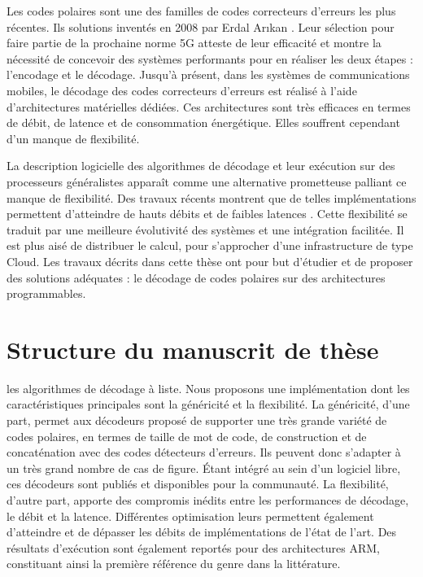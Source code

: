 Les codes polaires sont une des familles de codes correcteurs d'erreurs les plus récentes. Ils solutions inventés en 2008 par Erdal Ar{\i}kan \cite{arikan_channel_2009}. Leur sélection pour faire partie de la prochaine norme 5G atteste de leur efficacité et montre la nécessité de concevoir des systèmes performants pour en réaliser les deux étapes : l'encodage et le décodage. Jusqu'à présent, dans les systèmes de communications mobiles, le décodage des codes correcteurs d'erreurs est réalisé à l'aide d'architectures matérielles dédiées. Ces architectures sont très efficaces en termes de débit, de latence et de consommation énergétique. Elles souffrent cependant d'un manque de flexibilité.


La description logicielle des algorithmes de décodage et leur exécution sur des processeurs généralistes apparaît comme une alternative prometteuse palliant ce manque de flexibilité. Des travaux récents montrent que de telles implémentations permettent d'atteindre de hauts débits et de faibles latences \cite{sarkis_fast_2014,giard_fast_2014}. Cette flexibilité se traduit par une meilleure évolutivité des systèmes et une intégration facilitée. Il est plus aisé de distribuer le calcul, pour s'approcher d'une infrastructure de type Cloud. Les travaux décrits dans cette thèse ont pour but d'étudier et de proposer des solutions adéquates : le décodage de codes polaires sur des architectures programmables.

\section*{Structure du manuscrit de thèse}

les algorithmes de décodage à liste. Nous proposons une implémentation dont les caractéristiques principales sont la généricité et la flexibilité. La généricité, d'une part, permet aux décodeurs proposé de supporter une très grande variété de codes polaires, en termes de taille de mot de code, de construction et de concaténation avec des codes détecteurs d'erreurs. Ils peuvent donc s'adapter à un très grand nombre de cas de figure. \'Etant intégré au sein d'un logiciel libre, ces décodeurs sont publiés et disponibles pour la communauté. La flexibilité, d'autre part, apporte des compromis inédits entre les performances de décodage, le débit et la latence. Différentes optimisation leurs permettent également d'atteindre et de dépasser les débits de implémentations de l'état de l'art. Des résultats d'exécution sont également reportés pour des architectures ARM, constituant ainsi la première référence du genre dans la littérature.

